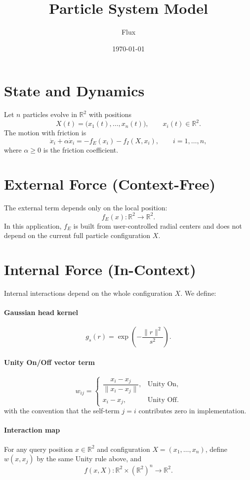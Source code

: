\documentclass[11pt]{article}
\title{Particle System Model}
\author{Flux}
\date{\today}
\begin{document}
\maketitle

\section{State and Dynamics}
Let $n$ particles evolve in $\mathbb{R}^2$ with positions
\[
X(t) = \big(x_1(t),\dots,x_n(t)\big), \qquad x_i(t)\in\mathbb{R}^2.
\]
The motion with friction is
\[
\ddot{x}_i + \alpha \dot{x}_i = -f_E(x_i) - f_I(X,x_i), \qquad i=1,\dots,n,
\]
where $\alpha\ge 0$ is the friction coefficient.

\section{External Force (Context-Free)}
The external term depends only on the local position:
\[
f_E(x) : \mathbb{R}^2 \to \mathbb{R}^2.
\]
In this application, $f_E$ is built from user-controlled radial centers and does not depend on the current full particle configuration $X$.

\section{Internal Force (In-Context)}
Internal interactions depend on the whole configuration $X$. We define:

\paragraph{Gaussian head kernel}
\[
g_s(r)=\exp\!\left(-\frac{\|r\|^2}{s^2}\right).
\]

\paragraph{Unity On/Off vector term}
\[
w_{ij}=
\begin{cases}
\dfrac{x_i-x_j}{\|x_i-x_j\|}, & \text{Unity On},\\[0.75em]
x_i-x_j, & \text{Unity Off}.
\end{cases}
\]
with the convention that the self-term $j=i$ contributes zero in implementation.

\paragraph{Interaction map}
For any query position $x\in\mathbb{R}^2$ and configuration
$X=(x_1,\dots,x_n)$, define $w(x,x_j)$ by the same Unity rule above, and
\[
f(x,X):\mathbb{R}^2\times(\mathbb{R}^2)^n\to\mathbb{R}^2.
\]
\end{document}
